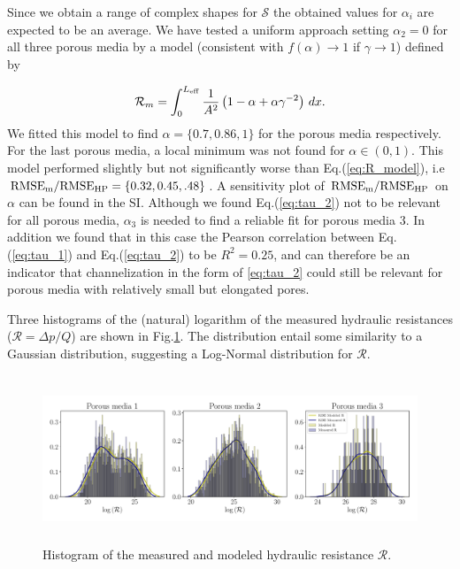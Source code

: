 \documentclass[draft]{agujournal2019}
\begin{document}
Since we obtain a range of complex shapes for $\mathcal{S}$ the obtained values for $\alpha_i$ are expected to be an average. We have tested a uniform approach setting $\alpha_2 = 0$ for all three porous media by a model (consistent with $f(\alpha)\rightarrow 1$ if $\gamma \rightarrow 1$) defined by 

\begin{equation}
	\mathcal{R}_m = \int^{L_{\rm{eff}}}_{0}\frac{1}{A^2}\left(1-\alpha + \alpha \gamma^{-2}\right)\,dx\label{eq:R_model_uniform}.
\end{equation}
We fitted this model to find $\alpha = \{0.7, 0.86, 1\}$ for the porous media respectively. For the last porous media, a local minimum was not found for $\alpha \in(0,1)$. This model performed slightly but not significantly worse than Eq.(\ref{eq:R_model}), i.e $\rm{RMSE}_m/\rm{RMSE}_{HP} = \{0.32, 0.45, .48\}$. A sensitivity plot of $\rm{RMSE}_m/\rm{RMSE}_{HP}$ on $\alpha$ can be found in the SI. Although we found Eq.(\ref{eq:tau_2}) not to be relevant for all porous media, $\alpha_3$ is needed to find a reliable fit for porous media 3. In addition we found that in this case the Pearson correlation between Eq.(\ref{eq:tau_1}) and Eq.(\ref{eq:tau_2}) to be $R^2= 0.25$, and can therefore be an indicator that channelization in the form of \ref{eq:tau_2} could still be relevant for porous media with relatively small but elongated pores. 



Three histograms of the (natural) logarithm of the measured hydraulic resistances ($\mathcal{R}=\Delta p/Q$) are shown in Fig.\ref{fig:histogram_R}. The distribution entail some similarity to a Gaussian distribution, suggesting a Log-Normal distribution for $\mathcal{R}$. 







\begin{figure}
\includegraphics[height=5cm]{figures/hydraulic_conductivity_integrated_histogram.pdf}
\caption{Histogram of the measured and modeled hydraulic resistance $\mathcal{R}$.}
\label{fig:histogram_R}
\end{figure}
\end{document}

